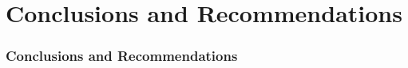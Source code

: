 \section{Conclusions and Recommendations}

\begin{frame}
\frametitle{Conclusions and Recommendations}


\end{frame}
